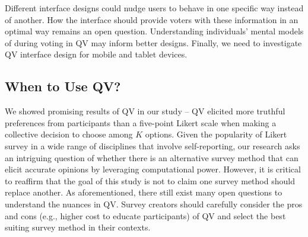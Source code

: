 Different interface designs could nudge users to behave in one specific way instead of another. How the interface should provide voters with these information in an optimal way remains an open question. Understanding individuals' mental models of during voting in QV may inform better designs. Finally, we need to investigate QV interface design for mobile and tablet devices.

\subsection{When to Use QV?}
We showed promising results of QV in our study -- QV elicited more truthful preferences from participants than a five-point Likert scale when making a collective decision to choose among $K$ options. Given the popularity of Likert survey in a wide range of disciplines that involve self-reporting, our research asks an intriguing question of whether there is an alternative survey method that can elicit accurate opinions by leveraging computational power. However, it is critical to reaffirm that the goal of this study is not to claim one survey method should replace another. As aforementioned, there still exist many open questions to understand the nuances in QV. Survey creators should carefully consider the pros and cons (e.g., higher cost to educate participants) of QV and select the best suiting survey method in their contexts.





